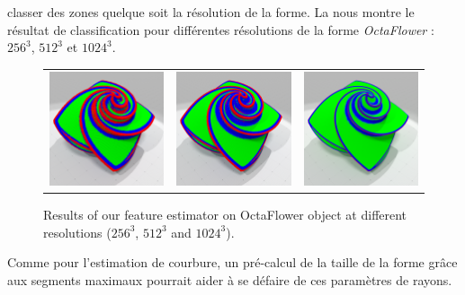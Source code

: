 classer des zones quelque soit la résolution de la forme. La
 nous montre le résultat de classification pour
différentes résolutions de la forme \emph{OctaFlower} : $256^3$, $512^3$ et
$1024^3$.
%
\begin{figure}[ht]
  \begin{center}
    \setlength{\tabcolsep}{1pt}
    \begin{tabular}{c c c}
      \includegraphics[width=4cm]{images/Feature/OctaFlower_256_II_scale} &
      \includegraphics[width=4cm]{images/Feature/OctaFlower_512_II_scale} &
      \includegraphics[width=4cm]{images/Feature/OctaFlower_1024_II_scale}
    \end{tabular}
    \caption{Results of our feature estimator on OctaFlower object at different resolutions ($256^3$, $512^3$ and $1024^3$).\label{fig:feature-octa}}
  \end{center}
\end{figure}
%
Comme pour l'estimation de courbure, un pré-calcul de la taille de la forme
grâce aux segments maximaux pourrait aider à se défaire de ces paramètres de
rayons.
%
